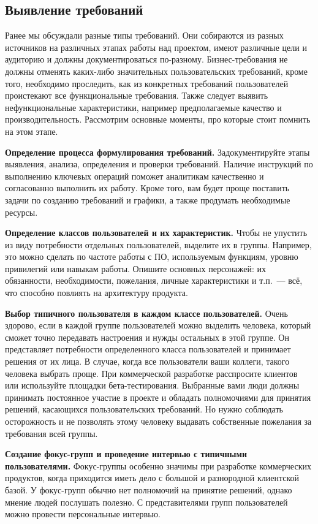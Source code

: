 \documentclass{../../text-style}
\begin{document}
\subsection{Выявление требований}

Ранее мы обсуждали разные типы требований.
Они собираются из разных источников на различных этапах работы над проектом, имеют различные цели и аудиторию и должны документироваться по-разному.
Бизнес-требования не должны отменять каких-либо значительных пользовательских требований, кроме того, необходимо проследить, как из конкретных требований пользователей проистекают все функциональные требования.
Также следует выявить нефункциональные характеристики, например предполагаемые качество и производительность.
Рассмотрим основные моменты, про которые стоит помнить на этом этапе.

\textbf{Определение процесса формулирования требований.}
Задокументируйте этапы выявления, анализа, определения и проверки требований.
Наличие инструкций по выполнению ключевых операций поможет аналитикам качественно и согласованно выполнить их работу.
Кроме того, вам будет проще поставить задачи по созданию требований и графики, а также продумать необходимые ресурсы.

\textbf{Определение классов пользователей и их характеристик.}
Чтобы не упустить из виду потребности отдельных пользователей, выделите их в группы.
Например, это можно сделать по частоте работы с ПО, используемым функциям, уровню привилегий или навыкам работы.
Опишите основных персонажей: их обязанности, необходимости, пожелания, личные характеристики и т.п.~--- всё, что способно повлиять на архитектуру продукта.

\textbf{Выбор типичного пользователя в каждом классе пользователей.}
Очень здорово, если в каждой группе пользователей можно выделить человека, который сможет точно передавать настроения и нужды остальных в этой группе.
Он представляет потребности определенного класса пользователей и принимает решения от их лица.
В случае, когда все пользователи ваши коллеги, такого человека выбрать проще.
При коммерческой разработке расспросите клиентов или используйте площадки бета-тестирования.
Выбранные вами люди должны принимать постоянное участие в проекте и обладать полномочиями для принятия решений, касающихся пользовательских требований.
Но нужно соблюдать осторожность и не позволять этому человеку выдавать собственные пожелания за требования всей группы.

\textbf{Создание фокус-групп и проведение интервью с типичными пользователями.}
Фокус-группы особенно значимы при разработке коммерческих продуктов, когда приходится иметь дело с большой и разнородной клиентской базой.
У фокус-групп обычно нет полномочий на принятие решений, однако мнение людей послушать полезно.
С представителями групп пользователей можно провести персональные интервью.
\end{document}

